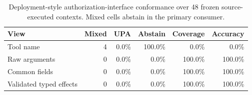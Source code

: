 \begin{table}[t]
\centering
\small
\caption{Deployment-style authorization-interface conformance over 48 frozen source-executed contexts. Mixed cells abstain in the primary consumer.}
\label{tab:deployment-authz-interface}
\begin{tabular}{lrrrrr}
\toprule
View & Mixed & UPA & Abstain & Coverage & Accuracy \\
\midrule
Tool name & 4 & 0.0\% & 100.0\% & 0.0\% & 0.0\% \\
Raw arguments & 0 & 0.0\% & 0.0\% & 100.0\% & 100.0\% \\
Common fields & 0 & 0.0\% & 0.0\% & 100.0\% & 100.0\% \\
Validated typed effects & 0 & 0.0\% & 0.0\% & 100.0\% & 100.0\% \\
\bottomrule
\end{tabular}
\end{table}
